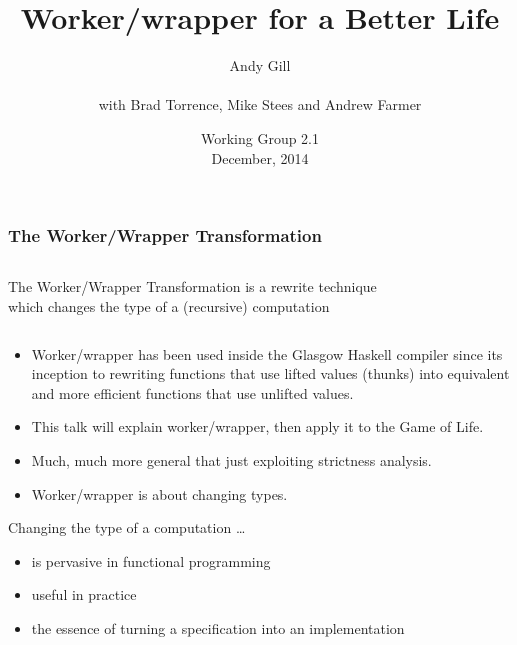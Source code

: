 \documentclass[smaller]{beamer}
\title{Worker/wrapper for a Better Life}
\author{Andy Gill\\
~\\
with Brad Torrence, Mike Stees and Andrew Farmer}
\institute{Information and Telecommunication Technology Center\\The University of Kansas}
\date{Working Group 2.1\\December, 2014}
\begin{document}
\frame{\titlepage}

\begin{frame}
\frametitle{The Worker/Wrapper Transformation}


\begin{columns}[t]
\begin{column}{0.8\textwidth}
\begin{block}{}
\begin{center}
The Worker/Wrapper Transformation is a rewrite technique\\
which changes the type of a (recursive) computation
\end{center}
\end{block}
\end{column}
\end{columns}


\vskip 0.1in

\begin{itemize}
\item Worker/wrapper has been used inside the Glasgow Haskell compiler since its inception to
rewriting functions that use lifted values (thunks) into equivalent and more efficient functions that use unlifted values.
\item This talk will explain worker/wrapper, then apply it to the Game of Life.
\item Much, much more general that just exploiting strictness analysis.
\item Worker/wrapper is about changing types.
\end{itemize}

\frameskip

\begin{block}{Changing the type of a computation \ldots}
\begin{itemize}
\item is pervasive in functional programming
\item useful in practice
\item the essence of turning a specification into an implementation
\end{itemize}
\end{block}

\end{frame}
\end{document}
